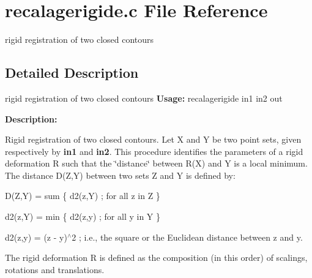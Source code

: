 \section{recalagerigide.c File Reference}
\label{recalagerigide_8c}


rigid registration of two closed contours  




\subsection{Detailed Description}
rigid registration of two closed contours {\bfseries Usage:} recalagerigide in1 in2 out

{\bfseries Description:}

Rigid registration of two closed contours. Let X and Y be two point sets, given respectively by {\bfseries in1} and {\bfseries in2}. This procedure identifies the parameters of a rigid deformation R such that the \char`\"{}distance\char`\"{} between R(X) and Y is a local minimum. The distance D(Z,Y) between two sets Z and Y is defined by:

D(Z,Y) = sum \{ d2(z,Y) ; for all z in Z \}

d2(z,Y) = min \{ d2(z,y) ; for all y in Y \}

d2(z,y) = (z -\/ y)$^\wedge$2 ; i.e., the square or the Euclidean distance between z and y.

The rigid deformation R is defined as the composition (in this order) of scalings, rotations and translations.

